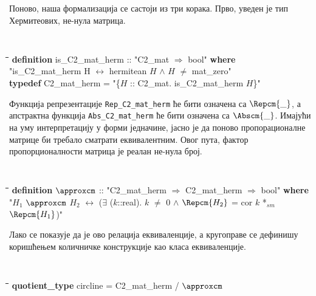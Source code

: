 Поново, наша формализација се састоји из три корака. Прво, уведен је
тип Хермитеових, не-нула матрица.

{\tt
\begin{tabbing}
\hspace{5mm}\=\hspace{5mm}\=\hspace{5mm}\=\hspace{5mm}\=\hspace{5mm}\=\kill
{\bf definition} is\_C2\_mat\_herm :: "C2\_mat $\Rightarrow$ bool" {\bf where}\\
\> "is\_C2\_mat\_herm H $\longleftrightarrow$ hermitean $H$ $\wedge$ $H$ $\neq$ mat\_zero"\\
{\bf typedef} C2\_mat\_herm = "\{$H$ :: C2\_mat. is\_C2\_mat\_herm $H$\}"
\end{tabbing}
}

Функција репрезентације {\tt Rep\_C2\_mat\_herm} ће бити означена са
$\Repcm{\_}$, а апстрактна функција {\tt Abs\_C2\_mat\_herm} ће бити
означена са $\Abscm{\_}$.  Имајући на уму интерпретацију у форми
једначине, јасно је да поново пропорационалне матрице би требало
сматрати еквивалентним. Овог пута, фактор пропорционалности матрица је
реалан не-нула број.

{\tt
\begin{tabbing}
\hspace{5mm}\=\hspace{5mm}\=\hspace{5mm}\=\hspace{5mm}\=\hspace{5mm}\=\kill
{\bf definition} $\approxcm$ :: "C2\_mat\_herm $\Rightarrow$ C2\_mat\_herm $\Rightarrow$ bool" {\bf where}\\
\>"$H_1$ $\approxcm$ $H_2$ $\longleftrightarrow$ ($\exists$ ($k$::real). $k$ $\neq$ $0$ $\wedge$ $\Repcm{H_2}$ = cor $k$ *$_{sm}$ $\Repcm{H_1}$)"
\end{tabbing}
}

Лако се показује да је ово релација еквиваленције, а кругоправе се
дефинишу коришћењем количничке конструкције као класа еквиваленције.

{\tt
\begin{tabbing}
\hspace{5mm}\=\hspace{5mm}\=\hspace{5mm}\=\hspace{5mm}\=\hspace{5mm}\=\kill
{\bf quotient\_type} circline = C2\_mat\_herm / $\approxcm$
\end{tabbing}
}

